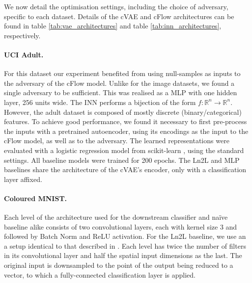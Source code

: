 We now detail the optimisation settings, including the choice of adversary, specific to each dataset. Details of the cVAE and cFlow architectures can be found in table \ref{tab:vae_architectures} and table \ref{tab:inn_architectures}, respectively.

\paragraph{UCI Adult.} 
For this dataset our experiment benefited from using null-samples as inputs to the adversary of the cFlow model. Unlike for the image datasets, we found a single adversary to be sufficient. This was realised as a \acf{MLP} with one hidden layer, 256 units wide. The \ac{INN} performs a bijection of the form $f: \mathbb{R}^n \rightarrow \mathbb{R}^n$. However, the adult dataset is composed of mostly discrete (binary/categorical) features. To achieve good performance, we found it necessary to first pre-process the inputs with a pretrained autoencoder, using its encodings as the input to the cFlow model, as well as to the adversary. The learned representations were evaluated with a logistic regression model from scikit-learn \citep{scikit-learn}, using the standard settings. All baseline models were trained for 200 epochs.
The Ln2L \citep{kim2019learning} and \ac{MLP} baselines share the architecture of the cVAE's encoder, only with a classification layer affixed.

\paragraph{Coloured MNIST.}
Each level of the architecture used for the downstream classifier and na\"ive baseline alike consists of two convolutional layers, each with kernel size 3 and followed by Batch Norm \citep{ioffe2015batch} and ReLU activation. For the Ln2L baseline, we use an a setup identical to that described in \citet{kim2019learning}. Each level has twice the number of filters in its convolutional layer and half the spatial input dimensions as the last. The original input is downsampled to the point of the output being reduced to a vector, to which a fully-connected classification layer is applied.

